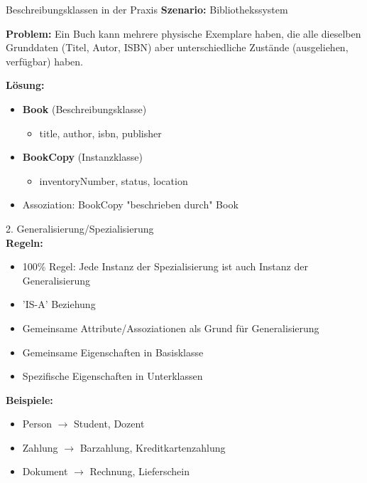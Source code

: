 \begin{example2}{Beschreibungsklassen in der Praxis}
\textbf{Szenario:} Bibliothekssystem

\textbf{Problem:} 
Ein Buch kann mehrere physische Exemplare haben, die alle dieselben Grunddaten (Titel, Autor, ISBN) aber unterschiedliche Zustände (ausgeliehen, verfügbar) haben.

\textbf{Lösung:}
\begin{itemize}
    \item \textbf{Book} (Beschreibungsklasse)
    \begin{itemize}
        \item title, author, isbn, publisher
    \end{itemize}
    \item \textbf{BookCopy} (Instanzklasse)
    \begin{itemize}
        \item inventoryNumber, status, location
    \end{itemize}
    \item Assoziation: BookCopy "beschrieben durch" Book
\end{itemize}
\end{example2}

\begin{concept}{2. Generalisierung/Spezialisierung}\\
\textbf{Regeln:}
\begin{itemize}
    \item 100\% Regel: Jede Instanz der Spezialisierung ist auch Instanz der Generalisierung
    \item 'IS-A' Beziehung
    \item Gemeinsame Attribute/Assoziationen als Grund für Generalisierung
    \item Gemeinsame Eigenschaften in Basisklasse
    \item Spezifische Eigenschaften in Unterklassen
\end{itemize}

\textbf{Beispiele:}
\begin{itemize}
    \item Person $\rightarrow$ Student, Dozent
    \item Zahlung $\rightarrow$ Barzahlung, Kreditkartenzahlung
    \item Dokument $\rightarrow$ Rechnung, Lieferschein
\end{itemize}
\end{concept}

